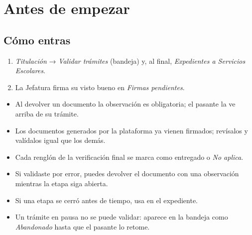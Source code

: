 \section{Antes de empezar}
\subsection*{Cómo entras}
\begin{enumerate}
  \item \emph{Titulación} → \emph{Validar trámites} (bandeja) y, al final, \emph{Expedientes a Servicios Escolares}.
  \item La Jefatura firma su visto bueno en \emph{Firmas pendientes}.
\end{enumerate}
\begin{tencuenta}
\begin{itemize}
  \item Al devolver un documento la observación es obligatoria; el pasante la ve arriba de su trámite.
  \item Los documentos generados por la plataforma ya vienen firmados; revísalos y valídalos igual que los demás.
  \item Cada renglón de la verificación final se marca como entregado o \emph{No aplica}.
\end{itemize}
\end{tencuenta}
\begin{algosalemal}
\begin{itemize}
  \item Si validaste por error, puedes devolver el documento con una observación mientras la etapa siga abierta.
  \item Si una etapa se cerró antes de tiempo, usa  en el expediente.
  \item Un trámite en pausa no se puede validar: aparece en la bandeja como \emph{Abandonado} hasta que el pasante lo retome.
\end{itemize}
\end{algosalemal}
